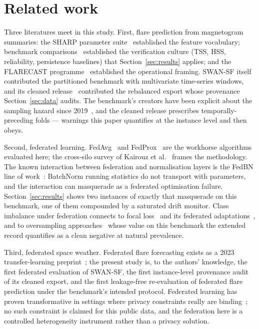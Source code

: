 \section{Related work}\label{sec:related}

Three literatures meet in this study. First, flare prediction from
magnetogram summaries: the SHARP parameter
suite~\cite{bobra2015} established the feature vocabulary; benchmark
comparisons~\cite{leka2019,georgoulis2021} established the
verification culture (TSS, HSS, reliability, persistence baselines)
that Section~\ref{sec:results} applies; and the FLARECAST
programme~\cite{georgoulis2021} established the operational framing.
SWAN-SF itself~\cite{angryk2020} contributed the partitioned
benchmark with multivariate time-series windows, and its cleaned
release~\cite{eskandari2024} contributed the rebalanced export whose
provenance Section~\ref{sec:data} audits. The benchmark's creators
have been explicit about the sampling hazard since
2019~\cite{angryk2019}, and the cleaned release prescribes
temporally-preceding folds --- warnings this paper quantifies at the
instance level and then obeys.

Second, federated learning. FedAvg~\cite{mcmahan2017} and
FedProx~\cite{li2020} are the workhorse algorithms evaluated here;
the cross-silo survey of Kairouz et
al.~\cite{kairouz2021} frames the methodology. The known interaction
between federation and normalisation layers is the FedBN line of
work~\cite{li2021fedbn}: BatchNorm running statistics do not
transport with parameters, and the interaction can masquerade as a
federated optimisation failure. Section~\ref{sec:results} shows two
instances of exactly that masquerade on this benchmark, one of them
compounded by a saturated drift monitor. Class imbalance under
federation connects to focal loss~\cite{lin2017} and its federated
adaptations~\cite{sarkar2020}, and to oversampling
approaches~\cite{chawla2002} whose value on this benchmark the
extended record quantifies as a clean negative at natural
prevalence.

Third, federated space weather. Federated flare forecasting exists
as a 2023 transfer-learning preprint~\cite{fu2023}; the present
study is, to the authors' knowledge, the first federated evaluation
of SWAN-SF, the first instance-level provenance audit of its cleaned
export, and the first leakage-free re-evaluation of federated flare
prediction under the benchmark's intended protocol. Federated
learning has proven transformative in settings where privacy
constraints really are binding~\cite{rieke2020}; no such constraint
is claimed for this public data, and the federation here is a
controlled heterogeneity instrument rather than a privacy solution.
